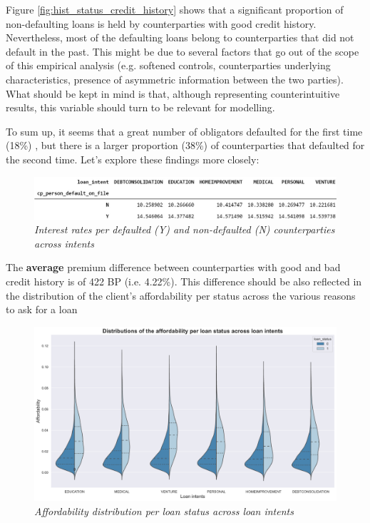 \documentclass[a4paper,12pt]{article}
\begin{document}
    Figure \ref{fig:hist_status_credit_history} shows that a significant proportion of non-defaulting loans is held by counterparties with good credit history. 
    Nevertheless, most of the defaulting loans belong to counterparties that did not default in the past. 
    This might be due to several factors that go out of the scope of this empirical analysis (e.g. softened controls, 
    counterparties underlying characteristics, presence of asymmetric information between the two parties). 
    What should be kept in mind is that, although representing counterintuitive results, this variable should turn to be relevant for modelling. 

    To sum up, it seems that a great number of obligators defaulted for the first time (18\%) , 
    but there is a larger proportion (38\%) of counterparties that defaulted for the second time. 
    Let's explore these findings more closely:
  
        \begin{figure}[H]
            \centerline{
                \includegraphics[width=\linewidth]{./images/loans_intents_credit_history_int_rate.jpg}
            }
            \caption{\textit{Interest rates per defaulted (Y) and non-defaulted (N) counterparties across intents}}
            \label{fig:loans_intents_credit_history_int_rate}
        \end{figure}
    
    The \textbf{average} premium difference between counterparties with good and bad credit history is of 422 BP (i.e. 4.22\%). 
    This difference should be also reflected in the distribution of the client's affordability per status across the 
    various reasons to ask for a loan

        \begin{figure}[H]
            \centerline{
                \includegraphics[width=\linewidth]{./images/loans_affordability_status_intents.png}
            }
            \caption{\textit{Affordability distribution per loan status across loan intents}}
            \label{fig:loans_affordability_status_intents}
        \end{figure}
\end{document}
